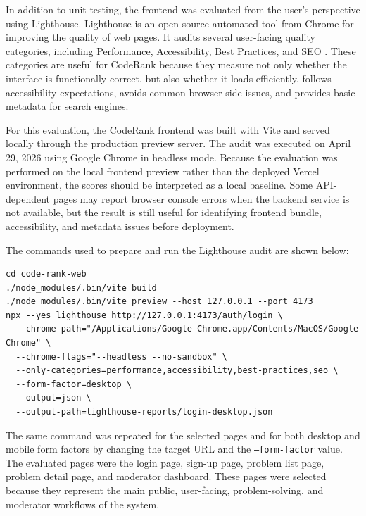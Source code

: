 In addition to unit testing, the frontend was evaluated from the user's perspective using Lighthouse. Lighthouse is an open-source automated tool from Chrome for improving the quality of web pages. It audits several user-facing quality categories, including Performance, Accessibility, Best Practices, and SEO \cite{lighthouse2026}. These categories are useful for CodeRank because they measure not only whether the interface is functionally correct, but also whether it loads efficiently, follows accessibility expectations, avoids common browser-side issues, and provides basic metadata for search engines.

For this evaluation, the CodeRank frontend was built with Vite and served locally through the production preview server. The audit was executed on April 29, 2026 using Google Chrome in headless mode. Because the evaluation was performed on the local frontend preview rather than the deployed Vercel environment, the scores should be interpreted as a local baseline. Some API-dependent pages may report browser console errors when the backend service is not available, but the result is still useful for identifying frontend bundle, accessibility, and metadata issues before deployment.

The commands used to prepare and run the Lighthouse audit are shown below:

\begin{verbatim}
cd code-rank-web
./node_modules/.bin/vite build
./node_modules/.bin/vite preview --host 127.0.0.1 --port 4173
npx --yes lighthouse http://127.0.0.1:4173/auth/login \
  --chrome-path="/Applications/Google Chrome.app/Contents/MacOS/Google Chrome" \
  --chrome-flags="--headless --no-sandbox" \
  --only-categories=performance,accessibility,best-practices,seo \
  --form-factor=desktop \
  --output=json \
  --output-path=lighthouse-reports/login-desktop.json
\end{verbatim}

The same command was repeated for the selected pages and for both desktop and mobile form factors by changing the target URL and the \texttt{--form-factor} value. The evaluated pages were the login page, sign-up page, problem list page, problem detail page, and moderator dashboard. These pages were selected because they represent the main public, user-facing, problem-solving, and moderator workflows of the system.

